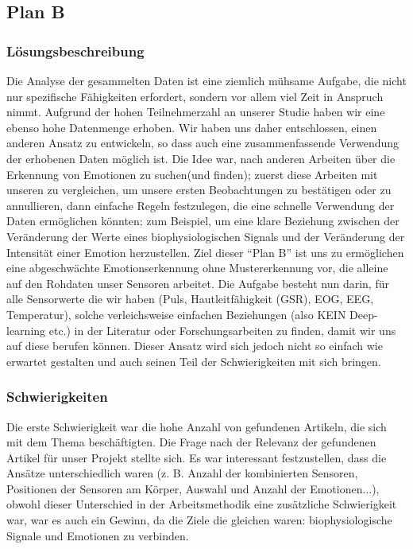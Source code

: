 \subsection{Plan B} \label{plan-b-4}



\subsubsection{Lösungsbeschreibung}

Die Analyse der gesammelten Daten ist eine ziemlich mühsame Aufgabe, die nicht nur spezifische Fähigkeiten erfordert, sondern vor allem viel Zeit in Anspruch nimmt. 
Aufgrund der hohen Teilnehmerzahl an unserer Studie haben wir eine ebenso hohe Datenmenge erhoben. 
Wir haben uns daher entschlossen, einen anderen Ansatz zu entwickeln, so dass auch eine zusammenfassende Verwendung der erhobenen Daten möglich ist. 
Die Idee war, nach anderen Arbeiten über die Erkennung von Emotionen zu suchen(und finden); 
zuerst diese Arbeiten mit unseren zu vergleichen, um unsere ersten Beobachtungen zu bestätigen oder zu annullieren, dann einfache Regeln festzulegen, die eine schnelle Verwendung der Daten ermöglichen könnten;
zum Beispiel, um eine klare Beziehung zwischen der Veränderung der Werte eines biophysiologischen Signals und der Veränderung der Intensität einer Emotion herzustellen. Ziel dieser ``Plan B'' ist uns zu ermöglichen eine abgeschwächte Emotionserkennung ohne Mustererkennung vor, die alleine auf den Rohdaten unser Sensoren arbeitet. 
Die Aufgabe besteht nun darin, für alle Sensorwerte die wir haben (Puls, Hautleitfähigkeit (GSR), EOG, EEG, Temperatur), solche verleichsweise einfachen Beziehungen (also KEIN Deep-learning etc.) in der Literatur oder Forschungsarbeiten zu finden, damit wir uns auf diese berufen können.
Dieser Ansatz wird sich jedoch nicht so einfach wie erwartet gestalten und auch seinen Teil der Schwierigkeiten mit sich bringen. \\


\subsubsection{Schwierigkeiten}

Die erste Schwierigkeit war die hohe Anzahl von gefundenen Artikeln, die sich mit dem Thema beschäftigten. 
Die Frage nach der Relevanz der gefundenen Artikel für unser Projekt stellte sich. 
Es war interessant festzustellen, dass die Ansätze unterschiedlich waren (z. B. Anzahl der kombinierten Sensoren, Positionen der Sensoren am Körper, Auswahl und Anzahl der Emotionen...), obwohl dieser Unterschied in der Arbeitsmethodik eine zusätzliche Schwierigkeit war, war es auch ein Gewinn, da die Ziele die gleichen waren:
biophysiologische Signale und Emotionen zu verbinden. \\



